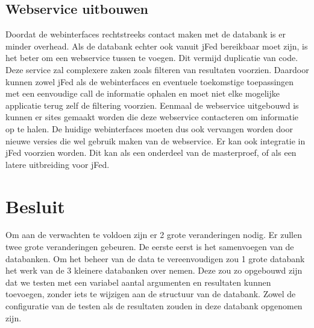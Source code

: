 \subsection{Webservice uitbouwen}
\npar
Doordat de webinterfaces rechtstreeks contact maken met de databank is er minder overhead. Als de databank echter ook vanuit jFed bereikbaar moet zijn, is het beter om een webservice tussen te voegen. Dit vermijd duplicatie van code. Deze service zal complexere zaken zoals filteren van resultaten voorzien. Daardoor kunnen zowel jFed als de webinterfaces en eventuele toekomstige toepassingen met een eenvoudige call de informatie ophalen en moet niet elke mogelijke applicatie terug zelf de filtering voorzien.
\npar
Eenmaal de webservice uitgebouwd is kunnen er sites gemaakt worden die deze webservice contacteren om informatie op te halen. De huidige webinterfaces moeten dus ook vervangen worden door nieuwe versies die wel gebruik maken van de webservice. Er kan ook integratie in jFed voorzien worden. Dit kan als een onderdeel van de masterproef, of als een latere uitbreiding voor jFed.

\section{Besluit}
\npar
Om aan de verwachten te voldoen zijn er 2 grote veranderingen nodig. 
Er zullen twee grote veranderingen gebeuren. De eerste eerst is het samenvoegen van de databanken. Om het beheer van de data te vereenvoudigen zou 1 grote databank het werk van de 3 kleinere databanken over nemen. Deze zou zo opgebouwd zijn dat we testen met een variabel aantal argumenten en resultaten kunnen toevoegen, zonder iets te wijzigen aan de structuur van de databank. Zowel de configuratie van de testen als de resultaten zouden in deze databank opgenomen zijn.
